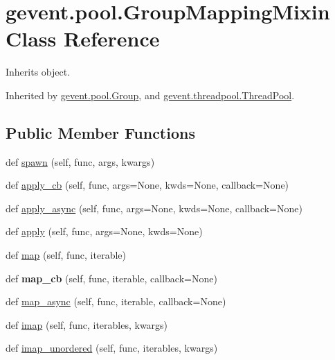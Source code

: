 \hypertarget{classgevent_1_1pool_1_1_group_mapping_mixin}{}\section{gevent.\+pool.\+Group\+Mapping\+Mixin Class Reference}
\label{classgevent_1_1pool_1_1_group_mapping_mixin}


Inherits object.



Inherited by \hyperlink{classgevent_1_1pool_1_1_group}{gevent.\+pool.\+Group}, and \hyperlink{classgevent_1_1threadpool_1_1_thread_pool}{gevent.\+threadpool.\+Thread\+Pool}.

\subsection*{Public Member Functions}
\begin{DoxyCompactItemize}
\item 
def \hyperlink{classgevent_1_1pool_1_1_group_mapping_mixin_aef5d85d8e23d7d009a47555e75040034}{spawn} (self, func, args, kwargs)
\item 
def \hyperlink{classgevent_1_1pool_1_1_group_mapping_mixin_a3c630e95bd357dadd9dc1e1ab86acc8f}{apply\+\_\+cb} (self, func, args=None, kwds=None, callback=None)
\item 
def \hyperlink{classgevent_1_1pool_1_1_group_mapping_mixin_a941dbbc427759802773477a43b800e6e}{apply\+\_\+async} (self, func, args=None, kwds=None, callback=None)
\item 
def \hyperlink{classgevent_1_1pool_1_1_group_mapping_mixin_a041583aabc35041a8e43ccde41e574a2}{apply} (self, func, args=None, kwds=None)
\item 
def \hyperlink{classgevent_1_1pool_1_1_group_mapping_mixin_ab98092e4962dda9badad51318f2a2112}{map} (self, func, iterable)
\item 
\mbox{\label{classgevent_1_1pool_1_1_group_mapping_mixin_ab386743e92655a00cba1199588a072fa}} 
def {\bfseries map\+\_\+cb} (self, func, iterable, callback=None)
\item 
def \hyperlink{classgevent_1_1pool_1_1_group_mapping_mixin_a911ffc786f9671500b344a461d4527ba}{map\+\_\+async} (self, func, iterable, callback=None)
\item 
def \hyperlink{classgevent_1_1pool_1_1_group_mapping_mixin_a0c1b1d6ed667a020a99cc9c86fadf785}{imap} (self, func, iterables, kwargs)
\item 
def \hyperlink{classgevent_1_1pool_1_1_group_mapping_mixin_a2631d27e737e675bea211e4b5576325f}{imap\+\_\+unordered} (self, func, iterables, kwargs)
\end{DoxyCompactItemize}


